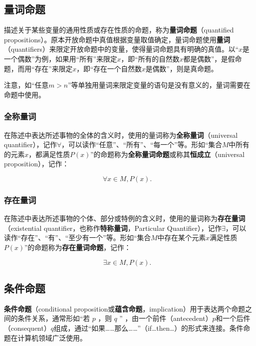 \subsection{量词命题}

描述关于某些变量的通用性质或存在性质的命题，称为\textbf{量词命题}（quantified propositions）。原本开放命题中真值根据变量取值确定，量词命题使用\textbf{量词}（quantifiers）来限定开放命题中的变量，使得量词命题具有明确的真值。以“$x$是一个偶数”为例，如果用“所有”来限定$x$，即“所有的自然数$x$都是偶数”，是假命题，而用“存在”来限定$x$，即“存在一个自然数$x$是偶数”，则是真命题。

注意，如“任意$m>n$”等单独用量词来限定变量的语句是没有意义的，量词需要在命题中使用。

\subsubsection{全称量词}

在陈述中表达所述事物的全体的含义时，使用的量词称为\textbf{全称量词}（universal quantifier），记作$\forall$，可以读作“任意”、“所有”、“每一个”等。形如“集合$M$中所有的元素$x$，都满足性质$P(x)$”的命题称为\textbf{全称量词命题}或称其\textbf{恒成立}（universal proposition），记作：


\begin{equation}
\forall x\in M,P(x).~
\end{equation}

\subsubsection{存在量词}

在陈述中表达所述事物的个体、部分或特例的含义时，使用的量词称为\textbf{存在量词}（existential quantifier，也称作\textbf{特称量词}，Particular Quantifier），记作$\exists$，可以读作“存在”、“有”、“至少有一个”等。形如“集合$M$中存在某个元素$x$满足性质$P(x)$”的命题称为\textbf{存在量词命题}，记作：

\begin{equation}
\exists x\in M,P(x).~
\end{equation}

\subsection{条件命题}

\textbf{条件命题}（conditional proposition或\textbf{蕴含命题}，implication）用于表达两个命题之间的条件关系，通常形如“若 $p$ ，则 $q$ ” ，由一个前件（antecedent）$p$和一个后件（consequent）$q$组成，通过“如果……那么……”（if…then…）的形式来连接。条件命题在计算机领域广泛使用。

